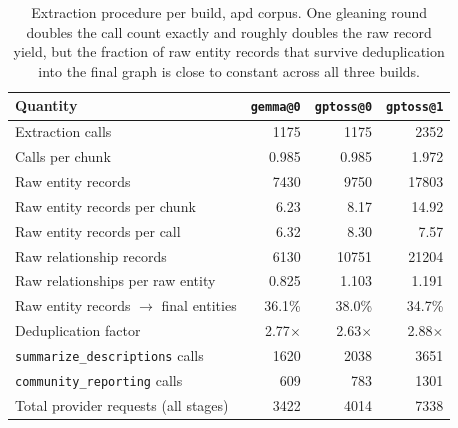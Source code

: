 \begin{table}[htbp]
  \centering
  \caption{Extraction procedure per build, apd corpus. One gleaning round doubles the call count
    exactly and roughly doubles the raw record yield, but the fraction of raw entity records that
    survive deduplication into the final graph is close to constant across all three builds.}
  \label{tab:graph-extraction-procedure}
  \begin{tabular}{lrrr}
    \toprule
    Quantity & \texttt{gemma@0} & \texttt{gptoss@0} & \texttt{gptoss@1} \\
    \midrule
    Extraction calls                       &  1175 &  1175 &  2352 \\
    Calls per chunk                        & 0.985 & 0.985 & 1.972 \\
    Raw entity records                     &  7430 &  9750 & 17803 \\
    Raw entity records per chunk           &  6.23 &  8.17 & 14.92 \\
    Raw entity records per call            &  6.32 &  8.30 &  7.57 \\
    Raw relationship records               &  6130 & 10751 & 21204 \\
    Raw relationships per raw entity       & 0.825 & 1.103 & 1.191 \\
    \midrule
    Raw entity records $\rightarrow$ final entities & 36.1\% & 38.0\% & 34.7\% \\
    Deduplication factor                   & 2.77$\times$ & 2.63$\times$ & 2.88$\times$ \\
    \midrule
    \texttt{summarize\_descriptions} calls &  1620 &  2038 &  3651 \\
    \texttt{community\_reporting} calls    &   609 &   783 &  1301 \\
    Total provider requests (all stages)   &  3422 &  4014 &  7338 \\
    \bottomrule
  \end{tabular}
\end{table}
